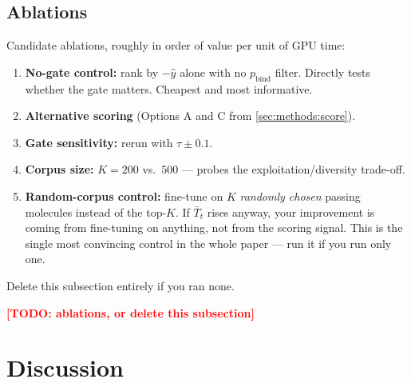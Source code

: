 \documentclass[11pt]{article}
\newcommand{\TODO}[1]{\textcolor{red}{\textbf{[TODO: #1]}}}
\newcommand{\pbind}{p_{\mathrm{bind}}}          %
\newcommand{\yhat}{\hat{y}}                     %
\newcommand{\Tbar}{\bar{T}}
\newcommand{\Kk}{K}
\begin{document}
\subsection{Ablations}
\label{sec:results:ablation}

\begin{guide}
Candidate ablations, roughly in order of value per unit of GPU time:
\begin{enumerate}\itemsep0pt
  \item \textbf{No-gate control:} rank by $-\yhat$ alone with no $\pbind$
        filter. Directly tests whether the gate matters. Cheapest and most
        informative.
  \item \textbf{Alternative scoring} (Options A and C from
        \cref{sec:methods:score}).
  \item \textbf{Gate sensitivity:} rerun with $\tau \pm 0.1$.
  \item \textbf{Corpus size:} $\Kk = 200$ vs.\ $500$ --- probes the
        exploitation/diversity trade-off.
  \item \textbf{Random-corpus control:} fine-tune on $\Kk$ \emph{randomly
        chosen} passing molecules instead of the top-$\Kk$. If $\Tbar_t$ rises
        anyway, your improvement is coming from fine-tuning on anything, not
        from the scoring signal. This is the single most convincing control in
        the whole paper --- run it if you run only one.
\end{enumerate}
Delete this subsection entirely if you ran none.
\end{guide}

\TODO{ablations, or delete this subsection}

\section{Discussion}
\label{sec:discussion}
\end{document}
